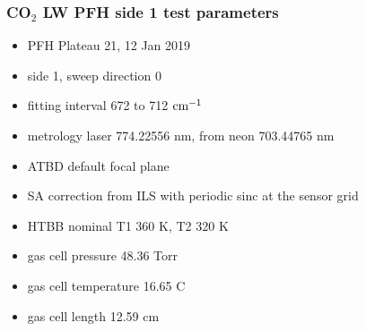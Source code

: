 \documentclass[10pt]{beamer}
\begin{document}
\begin{frame}
\frametitle{CO$_2$ LW PFH side 1 test parameters}

\begin{itemize}
  \item PFH Plateau 21, 12 Jan 2019
  \item side 1, sweep direction 0
  \item fitting interval 672 to 712 $\mbox{cm$^{-1}$}$
  \item metrology laser 774.22556 nm, from neon 703.44765 nm
  \item ATBD default focal plane
  \item SA correction from ILS with periodic sinc at the sensor grid
  \item HTBB nominal T1 360 K, T2 320 K
  \item gas cell pressure 48.36 Torr
  \item gas cell temperature 16.65 C
  \item gas cell length 12.59 cm
\end{itemize}

\end{frame}
\end{document}

